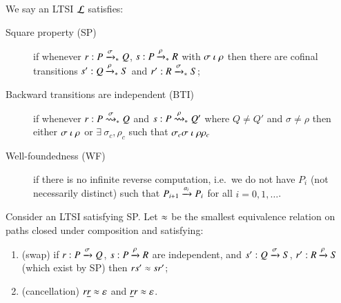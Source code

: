 


\begin{definition}\label{def:basic}
  We say an LTSI $\mathcal{L}$ satisfies:
  \begin{description}
  \item[Square property (SP)] if whenever $r:P \xrightarrow[]{\sigma}_{*} Q$, $s:P
    \xrightarrow[]{\rho}_{*} R$ with $\sigma \mathrel{\iota} \rho$ then there are cofinal
    transitions $s': Q \xrightarrow[]{\rho}_{*} S$ and $r':R \xrightarrow[]{\sigma}_{*}
    S$;%
  \item[Backward transitions are independent (BTI)] if whenever $r:P
    \stackrel{\sigma}{\rightsquigarrow}_{*} Q$ and $s: P \stackrel{\rho}{\rightsquigarrow}_{*} Q'$ where $Q\neq Q'$ and $\sigma \neq
    \rho$ then either $\sigma \mathrel{\iota} \rho$ or $\exists~\sigma_c,
    \rho_c$ such that $\sigma_c\sigma \mathrel{\iota} \rho\rho_c$
  \item[Well-foundedness (WF)] if there is no infinite reverse
    computation, i.e.\ we do not have $P_i$ (not necessarily distinct)
    such that $P_{i+1} \xrightarrow[]{a_i} P_i$ for all $i = 0,1,\ldots$.
  \end{description}
\end{definition}

\begin{definition}\label{def:ceqt}
  Consider an LTSI satisfying SP.
  Let $\approx$ be the smallest equivalence relation on paths closed under composition and satisfying:
  \begin{enumerate}
  \item
    (swap)  
    if $r:P \xrightarrow[]{\sigma} Q$, $s:P \xrightarrow[]{\rho} R$ are independent,
    and $s': Q \xrightarrow[]{\sigma} S$, $r':R \xrightarrow[]{\rho} S$ (which exist by SP)
    then $rs' \approx sr'$;
  \item
    (cancellation)
    $r \underline{r} \approx \varepsilon$ \quad and \quad $\underline{r} r \approx \varepsilon$.
  \end{enumerate}
\end{definition}